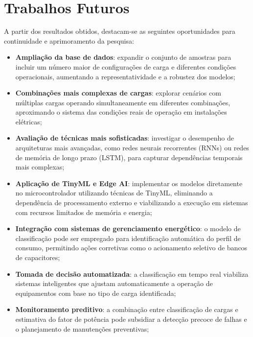 \section{Trabalhos Futuros}
A partir dos resultados obtidos, destacam-se as seguintes oportunidades para continuidade e aprimoramento da pesquisa:

\begin{itemize}
    \item \textbf{Ampliação da base de dados}: expandir o conjunto de amostras para incluir um número maior de configurações de carga e diferentes condições operacionais, aumentando a representatividade e a robustez dos modelos;

    \item \textbf{Combinações mais complexas de cargas}: explorar cenários com múltiplas cargas operando simultaneamente em diferentes combinações, aproximando o sistema das condições reais de operação em instalações elétricas;

    \item \textbf{Avaliação de técnicas mais sofisticadas}: investigar o desempenho de arquiteturas mais avançadas, como redes neurais recorrentes (RNNs) ou redes de memória de longo prazo (LSTM), para capturar dependências temporais mais complexas;

    \item \textbf{Aplicação de TinyML e Edge AI}: implementar os modelos diretamente no microcontrolador utilizando técnicas de TinyML, eliminando a dependência de processamento externo e viabilizando a execução em sistemas com recursos limitados de memória e energia;

    \item \textbf{Integração com sistemas de gerenciamento energético}: o modelo de classificação pode ser empregado para identificação automática do perfil de consumo, permitindo ações corretivas como o acionamento seletivo de bancos de capacitores;

    \item \textbf{Tomada de decisão automatizada}: a classificação em tempo real viabiliza sistemas inteligentes que ajustam automaticamente a operação de equipamentos com base no tipo de carga identificada;

    \item \textbf{Monitoramento preditivo}: a combinação entre classificação de cargas e estimativa do fator de potência pode subsidiar a detecção precoce de falhas e o planejamento de manutenções preventivas;


\end{itemize}
